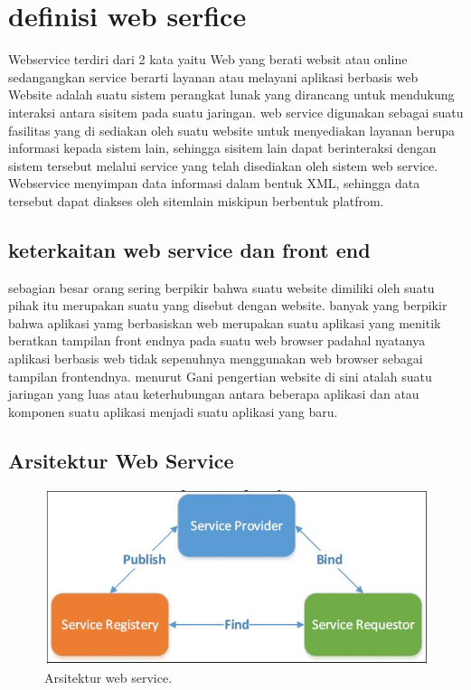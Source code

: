 \section{definisi web serfice }
Webservice terdiri dari 2 kata yaitu Web yang berati websit atau online 
sedangangkan service berarti layanan atau melayani aplikasi berbasis web 
Website adalah suatu sistem perangkat lunak yang dirancang untuk mendukung interaksi antara sisitem pada suatu jaringan.
web service digunakan sebagai suatu fasilitas yang di sediakan oleh suatu website untuk menyediakan layanan berupa informasi kepada 
sistem lain, sehingga sisitem lain dapat berinteraksi dengan sistem tersebut melalui service yang telah disediakan oleh sistem web service.
Webservice menyimpan data informasi dalam bentuk XML, sehingga data tersebut dapat diakses oleh sitemlain miskipun berbentuk platfrom. 
\subsection{keterkaitan web service dan front end }
sebagian besar orang sering berpikir bahwa suatu website dimiliki oleh suatu pihak 
itu merupakan suatu yang disebut dengan website. banyak yang berpikir bahwa aplikasi yamg berbasiskan 
web merupakan suatu aplikasi yang menitik beratkan tampilan front endnya pada suatu web browser 
padahal nyatanya aplikasi berbasis web tidak sepenuhnya menggunakan web browser sebagai tampilan 
frontendnya. menurut Gani pengertian website di sini atalah suatu jaringan yang luas atau keterhubungan 
antara beberapa aplikasi dan atau komponen suatu aplikasi menjadi suatu aplikasi yang baru.

\subsection{Arsitektur Web Service}
\begin{figure}[ht]
\centerline{\includegraphics[width=1\textwidth]{figures/1arsitektur.JPG}}
\caption{Arsitektur web service.} 
\label{1arsitektur}
\end{figure}

